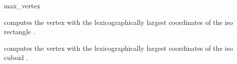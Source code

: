 \begin{ccRefFunction}{max_vertex}

 {computes the vertex with the lexicographically largest coordinates of the iso rectangle .}

 {computes the vertex with the lexicographically largest coordinates of the iso cuboid .}

\end{ccRefFunction}

